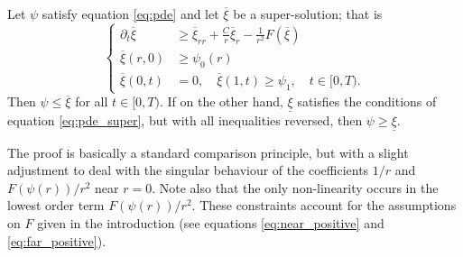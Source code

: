 \documentclass{amsart}
\begin{document}
\begin{thm}
Let \(\psi\) satisfy equation \eqref{eq:pde} and let \(\overline{\xi}\) be a super-solution; that is
\begin{equation}
\label{eq:pde_super}
\begin{cases}
\partial_t \overline{\xi} &\geq \overline{\xi}_{rr} + \frac{C}{r} \overline{\xi}_r - \frac{1}{r^2} F(\overline{\xi}) \\
\overline{\xi}(r, 0) &\geq \psi_0(r) \\
\overline{\xi}(0, t) &= 0, \quad \overline{\xi}(1, t) \geq \psi_1, \quad t \in [0, T).
\end{cases}
\end{equation}
Then \(\psi \leq \overline{\xi}\) for all \(t \in [0, T)\). If on the other hand, \(\underline{\xi}\) satisfies the conditions of equation \eqref{eq:pde_super}, but with all inequalities reversed, then \(\psi \geq \underline{\xi}\).
\end{thm}

The proof is basically a standard comparison principle, but with a slight adjustment to deal with the singular behaviour of the coefficients \(1/r\) and \(F(\psi(r))/r^2\) near \(r=0\). Note also that the only non-linearity occurs in the lowest order term \(F(\psi(r))/r^2\). These constraints account for the assumptions on \(F\) given in the introduction (see equations \eqref{eq:near_positive} and \eqref{eq:far_positive}).
\end{document}
